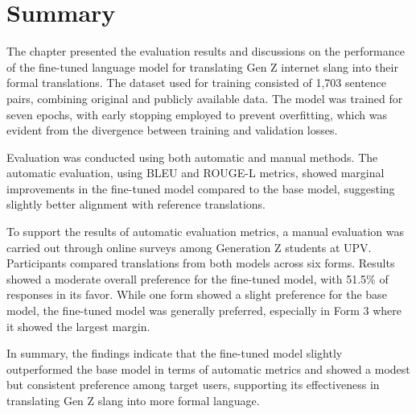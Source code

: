 \FloatBarrier

\section{Summary}
The chapter presented the evaluation results and discussions on the performance of the fine-tuned language model for translating Gen Z internet slang into their formal translations. The dataset used for training consisted of 1,703 sentence pairs, combining original and publicly available data. The model was trained for seven epochs, with early stopping employed to prevent overfitting, which was evident from the divergence between training and validation losses.

Evaluation was conducted using both automatic and manual methods. The automatic evaluation, using BLEU and ROUGE-L metrics, showed marginal improvements in the fine-tuned model compared to the base model, suggesting slightly better alignment with reference translations. 

To support the results of automatic evaluation metrics, a manual evaluation was carried out through online surveys among Generation Z students at UPV. Participants compared translations from both models across six forms. Results showed a moderate overall preference for the fine-tuned model, with 51.5\% of responses in its favor. While one form showed a slight preference for the base model, the fine-tuned model was generally preferred, especially in Form 3 where it showed the largest margin.

In summary, the findings indicate that the fine-tuned model slightly outperformed the base model in terms of automatic metrics and showed a modest but consistent preference among target users, supporting its effectiveness in translating Gen Z slang into more formal language.